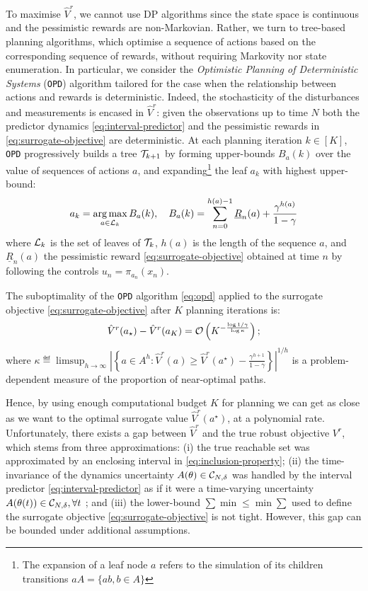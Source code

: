 \documentclass{article}
\begin{document}
To maximise $\hat{V}^r$, we cannot use DP algorithms since the state space is continuous and the pessimistic rewards are non-Markovian. Rather, we turn to tree-based planning algorithms, which optimise a sequence of actions based on the corresponding sequence of rewards, without requiring Markovity nor state enumeration. In particular, we consider the \emph{Optimistic Planning of Deterministic Systems} (\texttt{OPD}) algorithm \citep{Hren2008} tailored for the case when the relationship between actions and rewards is deterministic. Indeed, the stochasticity of the disturbances and measurements is encased in $\hat{V}^r$: given the observations up to time $N$ both the predictor dynamics \eqref{eq:interval-predictor} and the pessimistic rewards in \eqref{eq:surrogate-objective} are deterministic. At each planning iteration $k\in[K]$, \texttt{OPD} progressively builds a tree $\mathcal{T}_{k+1}$ by forming upper-bounds $B_a(k)$ over the value of sequences of actions $a$, and expanding\footnote{The expansion of a leaf node $a$ refers to the simulation of its children transitions $aA = \{ab, b\in A\}$} the leaf $a_k$ with highest upper-bound: 
\begin{equation}
\label{eq:opd}
a_k = \operatorname*{arg\,max}_{a\in\mathcal{L}_k} B_a(k), \quad B_a(k) = \sum_{n=0}^{h(a)-1} \underline{R}_n(a) + \frac{\gamma^{h(a)}}{1-\gamma}
\end{equation}
where $\mathcal{L}_k$ is the set of leaves of $\mathcal{T}_k$, $h(a)$ is the length of the sequence $a$, and $\underline{R}_n(a)$ the pessimistic reward \eqref{eq:surrogate-objective} obtained at time $n$ by following the controls $u_n = \pi_{a_n}(x_n)$.
\begin{lemma}
\label{theorem:opd-regret}
The suboptimality of the \texttt{OPD} algorithm \eqref{eq:opd} applied to the surrogate objective \eqref{eq:surrogate-objective} after $K$ planning iterations is:
$$
\hat{V}^r(a_{\star}) - \hat{V}^r({a_K}) = \mathcal{O}\left(K^{-\frac{\log 1/\gamma}{\log \kappa}}\right);
$$
where $\kappa \eqdef \limsup_{h\rightarrow\infty} \left|\left\{a\in A^h: \hat{V}^r(a)\geq \hat{V}^r(a^{\star}) - \frac{\gamma^{h+1}}{1-\gamma}\right\}\right|^{1/h}$ is a problem-dependent measure of the proportion of near-optimal paths.
\end{lemma}

Hence, by using enough computational budget $K$ for planning we can get as close as we want to the optimal surrogate value $\hat{V}^r(a^{\star})$, at a polynomial rate. Unfortunately, there exists a gap between $\hat{V}^r$ and the true robust objective $V^r$, which stems from three approximations: (i) the true reachable set was approximated by an enclosing interval in \eqref{eq:inclusion-property}; (ii) the time-invariance of the dynamics uncertainty $A(\theta)\in\mathcal{C}_{N,\delta}$ was handled by the interval predictor \eqref{eq:interval-predictor} as if it were a time-varying uncertainty $A(\theta(t))\in\mathcal{C}_{N,\delta},\forall t$ ; and (iii) the lower-bound $\sum\min\leq \min\sum$ used to define the surrogate objective \eqref{eq:surrogate-objective} is not tight. However, this gap can be bounded under additional assumptions.
\end{document}
